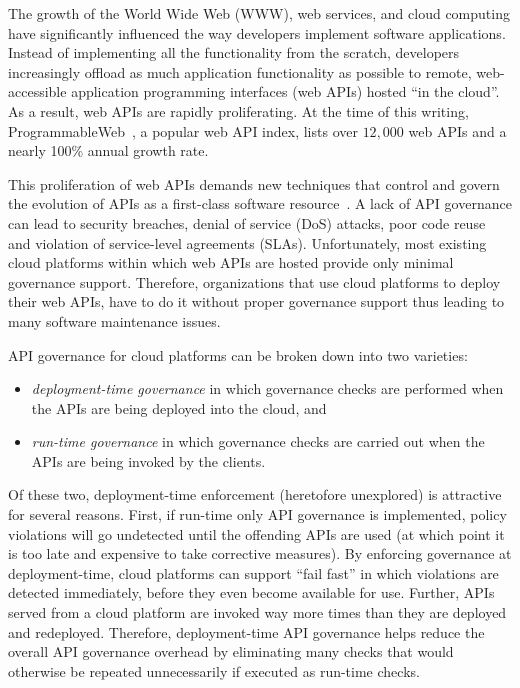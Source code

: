 The growth of the World Wide Web (WWW), web services, and cloud computing have
significantly influenced the way developers implement software applications.
Instead of implementing all the functionality from the scratch, developers
increasingly offload as much application functionality as possible to remote,
web-accessible application programming interfaces (web APIs) hosted ``in the
cloud''. As a result, web APIs are rapidly proliferating.
At the time of this writing, 
ProgrammableWeb~\cite{pweb}, a popular web API index, lists over $12,000$
web APIs and a nearly 100\% annual growth rate. 

This proliferation of web APIs demands new techniques that
control and govern the evolution of APIs as a first-class software
resource~\cite{6903538}. A lack of API governance can lead to 
security breaches, denial of service (DoS)
attacks, poor code reuse and violation of service-level agreements (SLAs). 
Unfortunately, most existing cloud platforms
within which web APIs are hosted provide only minimal governance support.
Therefore, organizations that use cloud platforms to deploy their web APIs, have to
do it without proper governance support thus leading to many software maintenance
issues.

API governance for cloud platforms can be broken down into two varieties:
\begin{itemize}
\item \textit{deployment-time governance} in which governance checks are performed 
when the APIs are being deployed into the cloud, and
\item \textit{run-time governance} in which governance checks are carried out when the APIs
are being invoked by the clients.
\end{itemize}
Of these two, 
deployment-time enforcement (heretofore unexplored) is attractive for several
reasons.  First, if run-time only API governance is implemented, 
policy violations will go undetected until the offending APIs are used (at which
point it is too late and expensive to take corrective measures).  
By enforcing governance at deployment-time,
cloud platforms can support ``fail fast'' in which violations are detected
immediately, before they even become available for use. Further, APIs served from a cloud
platform are invoked way more times than they are deployed and redeployed. 
Therefore, deployment-time API governance helps reduce the overall API governance
overhead by eliminating many checks that would otherwise be repeated unnecessarily
if executed as run-time checks.

